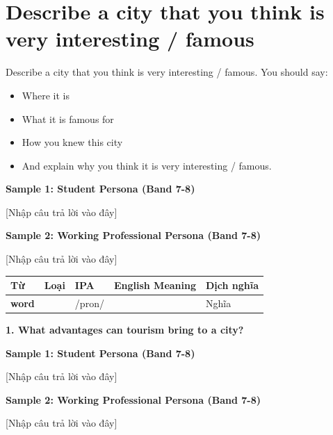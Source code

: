 \section{Describe a city that you think is very interesting / famous}
\begin{ieltsprompt}
Describe a city that you think is very interesting / famous.
You should say:
\begin{itemize}[leftmargin=2em, itemsep=2pt]
\item Where it is
\item What it is famous for
\item How you knew this city
\item And explain why you think it is very interesting / famous.
\end{itemize}
\end{ieltsprompt}
\begin{ieltsanswer}
\textbf{Sample 1: Student Persona (Band 7-8)}

[Nhập câu trả lời vào đây]

\textbf{Sample 2: Working Professional Persona (Band 7-8)}

[Nhập câu trả lời vào đây]
\end{ieltsanswer}


\vspace{0.8em}
\begin{center}
\renewcommand{\arraystretch}{1.65}
\begin{tabularx}{\textwidth}{|V{0.22\textwidth}|C{0.07\textwidth}|I{0.20\textwidth}|Y|V{0.18\textwidth}|}
\hline
{}
\textbf{Từ} & \textbf{Loại} & \textbf{IPA} & \textbf{English Meaning} & \textbf{Dịch nghĩa} \\
\hline
\textbf{word} & & /pron/ & & Nghĩa \\ \hline
\end{tabularx}
\end{center}

\partthreeheader

\begin{ieltsquestion}
\textbf{1. What advantages can tourism bring to a city?}
\end{ieltsquestion}
\textbf{Sample 1: Student Persona (Band 7-8)}

[Nhập câu trả lời vào đây]

\textbf{Sample 2: Working Professional Persona (Band 7-8)}

[Nhập câu trả lời vào đây]

